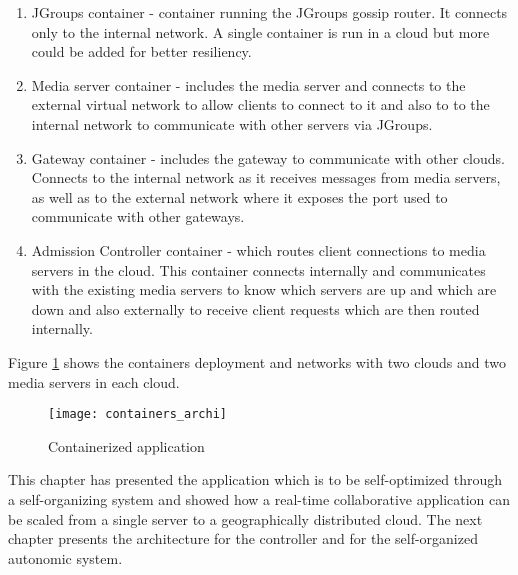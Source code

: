 \begin{enumerate} 
	\item JGroups container - container running the JGroups gossip router. It connects only to the internal network. A single container is run in a cloud but more could be added for better resiliency.
	\item Media server container - includes the media server and connects to the external virtual network to allow clients to connect to it and also to to the internal network to communicate with other servers via JGroups.
	\item Gateway container - includes the gateway to communicate with other clouds. Connects to the internal network as it receives messages from media servers, as well as to the external network where it exposes the port used to communicate with other gateways.
	\item Admission Controller container - which routes client connections to media servers in the cloud. This container connects internally and communicates with the existing media servers to know which servers are up and which are down and also externally to receive client requests which are then routed internally.
\end{enumerate}

Figure \ref{fig:cloudcontainers} shows the containers deployment and networks with two clouds and two media servers in each cloud.

\begin{figure}
	\centering
	\texttt{[image: containers\_archi]}
	\caption{Containerized application}
	\label{fig:cloudcontainers}
\end{figure}

This chapter has presented the application which is to be self-optimized through a self-organizing system and showed how a real-time collaborative application can be scaled from a single server to a geographically distributed cloud. The next chapter presents the architecture for the controller and for the self-organized autonomic system.